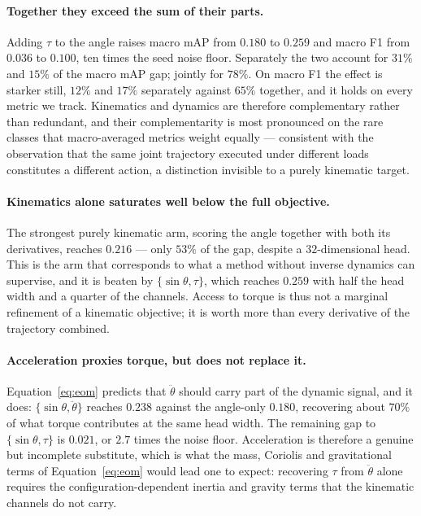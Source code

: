 \paragraph{Together they exceed the sum of their parts.} Adding $\tau$ to the angle
raises macro mAP from $0.180$ to $0.259$ and macro F1 from $0.036$ to $0.100$, ten times
the seed noise floor. Separately the two account for $31\%$ and $15\%$ of the macro mAP
gap; jointly for $78\%$. On macro F1 the effect is starker still, $12\%$ and $17\%$
separately against $65\%$ together, and it holds on every metric we track. Kinematics
and dynamics are therefore complementary rather than redundant, and their
complementarity is most pronounced on the rare classes that macro-averaged metrics
weight equally --- consistent with the observation that the same joint trajectory
executed under different loads constitutes a different action, a distinction invisible
to a purely kinematic target.

\paragraph{Kinematics alone saturates well below the full objective.} The strongest
purely kinematic arm, scoring the angle together with both its derivatives, reaches
$0.216$ --- only $53\%$ of the gap, despite a $32$-dimensional head. This is the arm
that corresponds to what a method without inverse dynamics can supervise, and it is
beaten by $\{\sin\theta,\tau\}$, which reaches $0.259$ with half the head width and a
quarter of the channels. Access to torque is thus not a marginal refinement of a
kinematic objective; it is worth more than every derivative of the trajectory combined.

\paragraph{Acceleration proxies torque, but does not replace it.} Equation~\ref{eq:eom}
predicts that $\ddot\theta$ should carry part of the dynamic signal, and it does:
$\{\sin\theta,\ddot\theta\}$ reaches $0.238$ against the angle-only $0.180$, recovering
about $70\%$ of what torque contributes at the same head width. The remaining gap to
$\{\sin\theta,\tau\}$ is $0.021$, or $2.7$ times the noise floor. Acceleration is
therefore a genuine but incomplete substitute, which is what the mass, Coriolis and
gravitational terms of Equation~\ref{eq:eom} would lead one to expect: recovering $\tau$
from $\ddot\theta$ alone requires the configuration-dependent inertia and gravity terms
that the kinematic channels do not carry.

